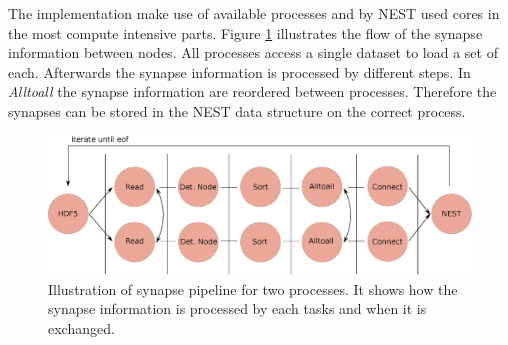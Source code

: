 \newpage
The implementation make use of available processes and by NEST used cores in the most compute intensive parts.
Figure \ref{fig:ConnectInsideIteration} illustrates the flow of the synapse information between nodes. 
All processes access a single dataset to load a set of each. Afterwards the synapse information is processed by different steps.
In \emph{Alltoall} the synapse information are reordered between processes.
Therefore the synapses can be stored in the NEST data structure on the correct process.
\begin{figure}[ht!]
\centering
\includegraphics[scale=0.4]{pictures/Connect_inside_iteration.eps}
\caption{Illustration of synapse pipeline for two processes. It shows how the synapse information is processed by each tasks and when it is exchanged.}
\label{fig:ConnectInsideIteration}
\end{figure}

\newpage
